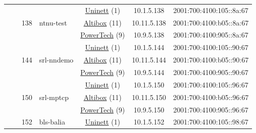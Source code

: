 \begin{small}
\begin{center}
\begin{longtable}{|c|c|c|c|c|c|c|c|}
  &  & \multirow{3}{*}{\tiny{138}} & \multicolumn{1}{|l|}{\multirow{3}{*}{\tiny{ntnu-test}}} & \multicolumn{2}{|c|}{\tiny{\href{https://www.uninett.no}{Uninett} (1)}} & \tiny{10.1.5.138} & \tiny{2001:700:4100:105::8a:67} \\* \cline{5-5}\cline{6-6}\cline{7-7}\cline{8-8}
  &  &  &  & \multicolumn{2}{|c|}{\tiny{\href{https://www.altibox.no}{Altibox} (11)}} & \tiny{10.11.5.138} & \tiny{2001:700:4100:b05::8a:67} \\* \cline{5-5}\cline{6-6}\cline{7-7}\cline{8-8}
  &  &  &  & \multicolumn{2}{|c|}{\tiny{\href{http://www.powertech.no}{PowerTech} (9)}} & \tiny{10.9.5.138} & \tiny{2001:700:4100:905::8a:67} \\* \cline{3-3}\cline{4-4}\cline{5-5}\cline{6-6}\cline{7-7}\cline{8-8}
  &  & \multirow{3}{*}{\tiny{144}} & \multicolumn{1}{|l|}{\multirow{3}{*}{\tiny{srl-nndemo}}} & \multicolumn{2}{|c|}{\tiny{\href{https://www.uninett.no}{Uninett} (1)}} & \tiny{10.1.5.144} & \tiny{2001:700:4100:105::90:67} \\* \cline{5-5}\cline{6-6}\cline{7-7}\cline{8-8}
  &  &  &  & \multicolumn{2}{|c|}{\tiny{\href{https://www.altibox.no}{Altibox} (11)}} & \tiny{10.11.5.144} & \tiny{2001:700:4100:b05::90:67} \\* \cline{5-5}\cline{6-6}\cline{7-7}\cline{8-8}
  &  &  &  & \multicolumn{2}{|c|}{\tiny{\href{http://www.powertech.no}{PowerTech} (9)}} & \tiny{10.9.5.144} & \tiny{2001:700:4100:905::90:67} \\* \cline{3-3}\cline{4-4}\cline{5-5}\cline{6-6}\cline{7-7}\cline{8-8}
  &  & \multirow{3}{*}{\tiny{150}} & \multicolumn{1}{|l|}{\multirow{3}{*}{\tiny{srl-mptcp}}} & \multicolumn{2}{|c|}{\tiny{\href{https://www.uninett.no}{Uninett} (1)}} & \tiny{10.1.5.150} & \tiny{2001:700:4100:105::96:67} \\* \cline{5-5}\cline{6-6}\cline{7-7}\cline{8-8}
  &  &  &  & \multicolumn{2}{|c|}{\tiny{\href{https://www.altibox.no}{Altibox} (11)}} & \tiny{10.11.5.150} & \tiny{2001:700:4100:b05::96:67} \\* \cline{5-5}\cline{6-6}\cline{7-7}\cline{8-8}
  &  &  &  & \multicolumn{2}{|c|}{\tiny{\href{http://www.powertech.no}{PowerTech} (9)}} & \tiny{10.9.5.150} & \tiny{2001:700:4100:905::96:67} \\* \cline{3-3}\cline{4-4}\cline{5-5}\cline{6-6}\cline{7-7}\cline{8-8}
  &  & \multirow{3}{*}{\tiny{152}} & \multicolumn{1}{|l|}{\multirow{3}{*}{\tiny{bls-balia}}} & \multicolumn{2}{|c|}{\tiny{\href{https://www.uninett.no}{Uninett} (1)}} & \tiny{10.1.5.152} & \tiny{2001:700:4100:105::98:67} \\* \cline{5-5}\cline{6-6}\cline{7-7}\cline{8-8}

\end{longtable}
\end{center}
\end{small}
